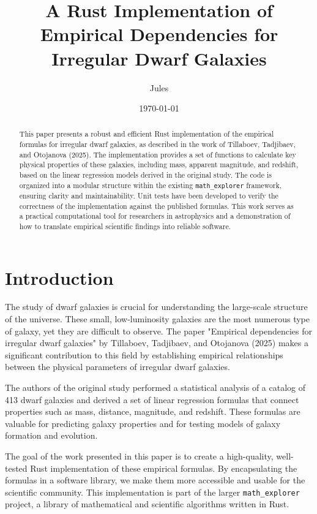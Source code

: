 \documentclass{article}
\title{A Rust Implementation of Empirical Dependencies for Irregular Dwarf Galaxies}
\author{Jules}
\date{\today}
\begin{document}
\maketitle

\begin{abstract}
This paper presents a robust and efficient Rust implementation of the empirical formulas for irregular dwarf galaxies, as described in the work of Tillaboev, Tadjibaev, and Otojanova (2025). The implementation provides a set of functions to calculate key physical properties of these galaxies, including mass, apparent magnitude, and redshift, based on the linear regression models derived in the original study. The code is organized into a modular structure within the existing \texttt{math\_explorer} framework, ensuring clarity and maintainability. Unit tests have been developed to verify the correctness of the implementation against the published formulas. This work serves as a practical computational tool for researchers in astrophysics and a demonstration of how to translate empirical scientific findings into reliable software.
\end{abstract}

\section{Introduction}

The study of dwarf galaxies is crucial for understanding the large-scale structure of the universe. These small, low-luminosity galaxies are the most numerous type of galaxy, yet they are difficult to observe. The paper "Empirical dependencies for irregular dwarf galaxies" by Tillaboev, Tadjibaev, and Otojanova (2025) makes a significant contribution to this field by establishing empirical relationships between the physical parameters of irregular dwarf galaxies.

The authors of the original study performed a statistical analysis of a catalog of 413 dwarf galaxies and derived a set of linear regression formulas that connect properties such as mass, distance, magnitude, and redshift. These formulas are valuable for predicting galaxy properties and for testing models of galaxy formation and evolution.

The goal of the work presented in this paper is to create a high-quality, well-tested Rust implementation of these empirical formulas. By encapsulating the formulas in a software library, we make them more accessible and usable for the scientific community. This implementation is part of the larger \texttt{math\_explorer} project, a library of mathematical and scientific algorithms written in Rust.
\end{document}
